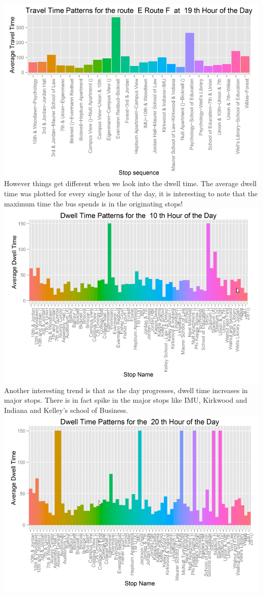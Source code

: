 \documentclass[12pt]{article}\usepackage[]{graphicx}\usepackage[]{color}
\begin{document}
\includegraphics[scale=0.4]{resources/ggplot3}\\[1cm] 
However things get different when we look into the dwell time. The average dwell time was plotted for every single hour of the day, it is interesting to note that the maximum time the bus spends is in the originating stops! \\
\includegraphics[scale=0.4]{resources/ggplot4}\\[1cm] 
Another interesting trend is that as the day progresses, dwell time increases in major stops. There is in fact spike in the major stops like IMU, Kirkwood and Indiana and Kelley's school of Business. \\
\includegraphics[scale=0.4]{resources/ggplot5}\\[1cm] 
\end{document}
